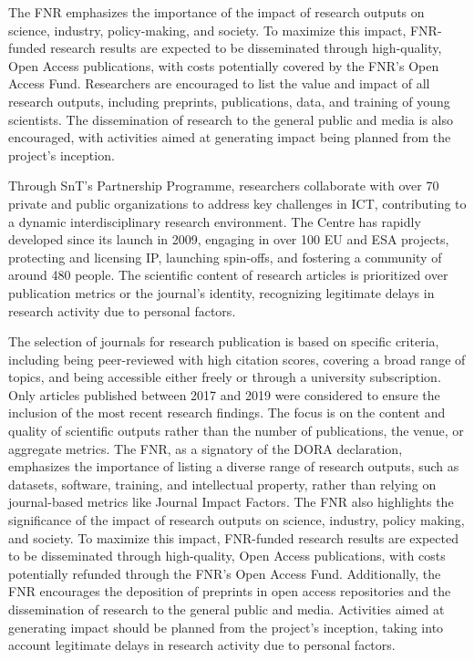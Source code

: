 \documentclass{article}
\begin{document}
The FNR emphasizes the importance of the impact of research outputs on science, industry, policy-making, and society. To maximize this impact, FNR-funded research results are expected to be disseminated through high-quality, Open Access publications, with costs potentially covered by the FNR’s Open Access Fund. Researchers are encouraged to list the value and impact of all research outputs, including preprints, publications, data, and training of young scientists. The dissemination of research to the general public and media is also encouraged, with activities aimed at generating impact being planned from the project's inception.

Through SnT’s Partnership Programme, researchers collaborate with over 70 private and public organizations to address key challenges in ICT, contributing to a dynamic interdisciplinary research environment. The Centre has rapidly developed since its launch in 2009, engaging in over 100 EU and ESA projects, protecting and licensing IP, launching spin-offs, and fostering a community of around 480 people. The scientific content of research articles is prioritized over publication metrics or the journal's identity, recognizing legitimate delays in research activity due to personal factors.

The selection of journals for research publication is based on specific criteria, including being peer-reviewed with high citation scores, covering a broad range of topics, and being accessible either freely or through a university subscription. Only articles published between 2017 and 2019 were considered to ensure the inclusion of the most recent research findings. The focus is on the content and quality of scientific outputs rather than the number of publications, the venue, or aggregate metrics. The FNR, as a signatory of the DORA declaration, emphasizes the importance of listing a diverse range of research outputs, such as datasets, software, training, and intellectual property, rather than relying on journal-based metrics like Journal Impact Factors. The FNR also highlights the significance of the impact of research outputs on science, industry, policy making, and society. To maximize this impact, FNR-funded research results are expected to be disseminated through high-quality, Open Access publications, with costs potentially refunded through the FNR’s Open Access Fund. Additionally, the FNR encourages the deposition of preprints in open access repositories and the dissemination of research to the general public and media. Activities aimed at generating impact should be planned from the project's inception, taking into account legitimate delays in research activity due to personal factors.
\end{document}
